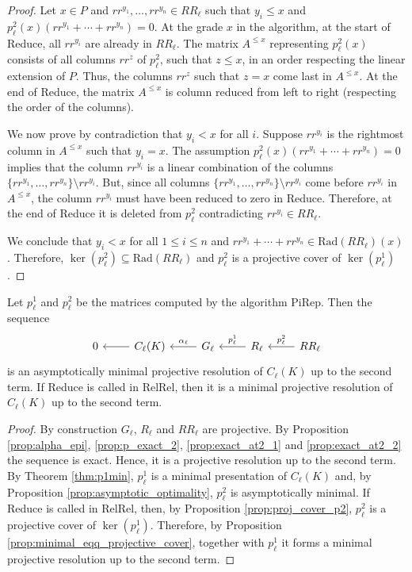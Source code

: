 \documentclass[english,a4paper,nolineno,cleveref]{socg-lipics-v2021}
\begin{document}
\begin{proof}
Let $x\in P$ and $rr^{y_1},\ldots,rr^{y_n}\in RR_\ell$ such that $y_i\leq x$ and $p^2_\ell(x)(rr^{y_1}+\cdots+rr^{y_n})=0$. At the grade $x$ in the algorithm, at the start of {\sc Reduce}, all $rr^{y_i}$ are already in $RR_\ell$. The matrix $A^{\leq x}$ representing $p_\ell^2(x)$ consists of all columns $rr^{z}$ of $p_\ell^2$, such that $z\leq x$, in an order respecting the linear extension of $P$. Thus, the columns $rr^{z}$ such that $z=x$ come last in $A^{\leq x}$. At the end of {\sc Reduce}, the matrix $A^{\leq x}$ is column reduced from left to right (respecting the order of the columns). 

We now prove by contradiction that $y_i<x$ for all $i$. Suppose $rr^{y_i}$ is the rightmost column in $A^{\leq x}$ such that $y_i=x$. The assumption $p^2_\ell(x)(rr^{y_1}+\cdots+rr^{y_n})=0$ implies that the column $rr^{y_i}$ is a linear combination of the columns $\{rr^{y_1},\ldots,rr^{y_n}\}\setminus rr^{y_i}$. But, since all columns $\{rr^{y_1},\ldots,rr^{y_n}\}\setminus rr^{y_i}$ come before $rr^{y_i}$ in $A^{\leq x}$, the column $rr^{y_i}$ must have been reduced to zero in {\sc Reduce}. Therefore, at the end of {\sc Reduce} it is deleted from $p_\ell^2$ contradicting $rr^{y_i}\in RR_\ell$.      

We conclude that $y_i<x$ for all $1\leq i\leq n$ and $rr^{y_1}+\cdots+rr^{y_n}\in \mathrm{Rad}(RR_\ell)(x)$. Therefore, $\ker(p_\ell^2)\subseteq \mathrm{Rad}(RR_\ell)$ and $p_\ell^2$ is a projective cover of $\ker(p_\ell^1)$.
\end{proof}

\begin{theorem} \label{thm:minimal_resolution}
Let $p_\ell^1$ and $p_\ell^2$ be the matrices computed by the algorithm {\sc PiRep}. Then the sequence
\begin{equation*}
\begin{tikzcd}
0 & C_\ell(K) \arrow[l] & G_\ell \arrow[l,swap,"\alpha_\ell"] & R_\ell \arrow[l,swap,"p_\ell^1"] & RR_\ell \arrow[l,swap,"p_\ell^2"]
\end{tikzcd}
\end{equation*}
is an asymptotically minimal projective resolution of $C_\ell(K)$ up to the second term. If {\sc Reduce} is called in {\sc RelRel}, then it is a minimal projective resolution of $C_\ell(K)$ up to the second term.
\end{theorem}

\begin{proof}
By construction $G_\ell$, $R_\ell$ and $RR_\ell$ are projective.
By Proposition \ref{prop:alpha_epi}, \ref{prop:p_exact_2}, \ref{prop:exact_at2_1} and \ref{prop:exact_at2_2} the sequence is exact. Hence, it is a projective resolution up to the second term. By Theorem \ref{thm:p1min}, $p_\ell^1$ is a minimal presentation of $C_\ell(K)$ and, by Proposition \ref{prop:asymptotic_optimality}, $p_\ell^2$ is asymptotically minimal. If {\sc Reduce} is called in {\sc RelRel}, then, by Proposition \ref{prop:proj_cover_p2}, $p_\ell^2$ is a projective cover of $\ker(p_\ell^1)$. Therefore, by Proposition \ref{prop:minimal_eqq_projective_cover}, together with $p_\ell^1$ it forms a minimal projective resolution up to the second term.
\end{proof}
\end{document}
